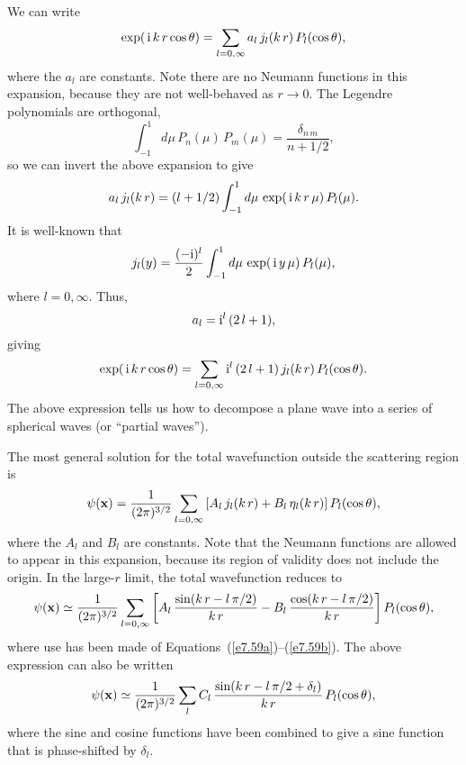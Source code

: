We can write
\begin{equation}
\exp(\,{\rm i}\,k\,r \cos\theta) = \sum_{l=0,\infty} a_l\, j_l(k\,r)\, P_l(\cos\theta),
\end{equation}
where the $a_l$ are constants. Note there are no  Neumann functions in
this expansion, because they are not well-behaved  as $r \rightarrow 0$. 
The Legendre polynomials  are orthogonal,
\begin{equation}\label{e7.61}
\int_{-1}^1 d\mu\,P_n(\mu) \,P_m(\mu) = \frac{\delta_{n\,m}}{n+1/2},
\end{equation}
so we can invert the above expansion to give
\begin{equation}
a_l \,j_l(k\,r) = (l+1/2)\int_{-1}^1 d\mu\,\exp(\,{\rm i}\,k\,r \,\mu) \,P_l(\mu).
\end{equation}
It is well-known that
\begin{equation}
j_l(y) = \frac{(-{\rm i})^l}{2} \int_{-1}^1 d\mu\, \exp(\,{\rm i}\, y\,\mu)
\,P_l(\mu),
\end{equation}
where $l=0, \infty$.  Thus,
\begin{equation}
a_l = {\rm i}^l \,(2\,l+1),
\end{equation}
giving
\begin{equation}
\exp(\,{\rm i}\,k\,r \cos\theta) = \sum_{l=0,\infty} {\rm i}^l\,
(2\,l+1)\, j_l(k\,r)\, P_l(\cos\theta).
\end{equation}
The above expression  tells us how to decompose
a plane wave  into
a series of spherical waves (or ``partial waves'').

The most general solution for the total wavefunction outside the
scattering region is
\begin{equation}
\psi({\bf x}) = \frac{1}{(2\pi)^{3/2}} \sum_{l=0,\infty}\left[
A_l\,j_l(k\,r) + B_l\,\eta_l(k\,r)\right] P_l(\cos\theta),
\end{equation}
where the $A_l$ and $B_l$ are constants. 
Note that the Neumann functions are allowed to appear 
in this expansion, because
its region of validity does not include the origin. In the large-$r$
limit, the total wavefunction reduces to
\begin{equation}
\psi ({\bf x} ) \simeq \frac{1}{(2\pi)^{3/2}} \sum_{l=0,\infty}\left[A_l\,
\frac{\sin(k\,r - l\,\pi/2)}{k\,r} - B_l\,\frac{\cos(k\,r -l\,\pi/2)}{k\,r}
\right] P_l(\cos\theta),
\end{equation}
where use has been made of Equations~(\ref{e7.59a})--(\ref{e7.59b}). The above expression can also
be written
\begin{equation}\label{e7.68}
\psi ({\bf x} ) \simeq \frac{1}{(2\pi)^{3/2}} \sum_l C_l\,
\frac{\sin(k\,r - l\,\pi/2+ \delta_l)}{k\,r}\, P_l(\cos\theta),
\end{equation}
where the sine and cosine functions have been combined to give a
sine function that is phase-shifted by $\delta_l$. 

